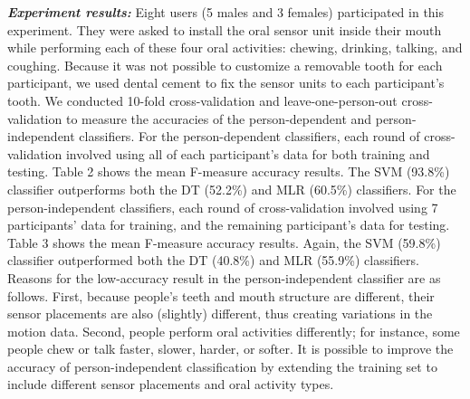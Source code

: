 \textsl{\textbf{Experiment results:}}
Eight users (5 males and 3 females) participated in this experiment. They were asked to install the oral sensor unit inside their mouth while performing each of these four oral activities: chewing, drinking, talking, and coughing. Because it was not possible to customize a removable tooth for each participant, we used dental cement to fix the sensor units to each participant's tooth.
We conducted 10-fold cross-validation and leave-one-person-out cross-validation to measure the accuracies of the person-dependent and person-independent classifiers. For the person-dependent classifiers, each round of cross-validation involved using all of each participant's data for both training and testing. Table 2 shows the mean F-measure accuracy results. The SVM (93.8\%) classifier outperforms both the DT (52.2\%) and MLR (60.5\%) classifiers. 
For the person-independent classifiers, each round of cross-validation involved using 7 participants' data for training, and the remaining participant's data for testing. Table 3 shows the mean F-measure accuracy results. Again, the SVM (59.8\%) classifier outperformed both the DT (40.8\%) and MLR (55.9\%) classifiers. Reasons for the low-accuracy result in the person-independent classifier are as follows.
First, because people's teeth and mouth structure are different, their sensor placements are also (slightly) different, thus creating variations in the motion data. Second, people perform oral activities differently; for instance, some people chew or talk faster, slower, harder, or softer. It is possible to improve the accuracy of person-independent classification by extending the training set to include different sensor placements and oral activity types.

